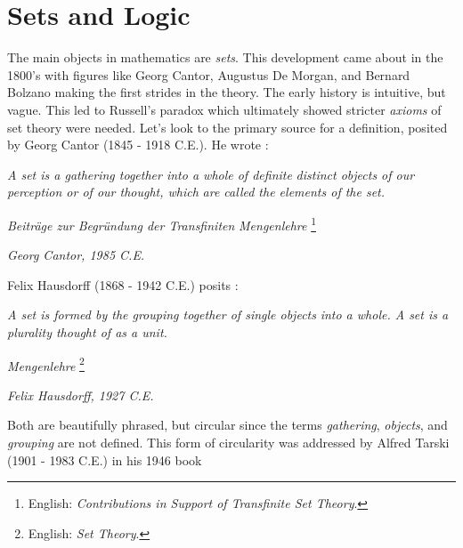     \section{Sets and Logic}
        The main objects in mathematics are \textit{sets}. This development came
        about in the 1800's with figures like Georg Cantor,
        Augustus De Morgan, and Bernard
        Bolzano making the first strides in the theory.
        The early history is intuitive, but vague. This led to Russell's
        paradox which
        ultimately showed stricter \textit{axioms} of set theory were needed.
        Let's look to the primary source for a definition, posited by Georg
        Cantor (1845 - 1918 C.E.). He wrote \cite{Cantor1895}:
        \begin{center}
            \textit{A set is a gathering together into a whole of definite}
            \textit{distinct objects of our perception or of our thought, which}
            \textit{are called the elements of the set.}
            \par\hfill
            \textit{Beitr\"{a}ge zur Begr\"{u}ndung der Transfiniten}
            \textit{Mengenlehre}%
            \footnote{%
                English:
                \textit{Contributions in Support of Transfinite Set Theory}.%
            }
            \par\hfill
            \textit{Georg Cantor, 1985 C.E.}
        \end{center}
        Felix Hausdorff (1868 - 1942 C.E.) posits
        \cite[p.~11]{HausdorffSetTheory}:
        \begin{center}
            \textit{A set is formed by the grouping together of single objects}
            \textit{into a whole. A set is a plurality thought of as a unit.}
            \par\hfill
            \textit{Mengenlehre}%
            \footnote{%
                English:
                \textit{Set Theory}.%
            }
            \par\hfill
            \textit{Felix Hausdorff, 1927 C.E.}
        \end{center}
        Both are beautifully phrased, but circular since the terms
        \textit{gathering}, \textit{objects}, and \textit{grouping} are not
        defined. This form of circularity was addressed by Alfred
        Tarski (1901 - 1983 C.E.) in his 1946 book
